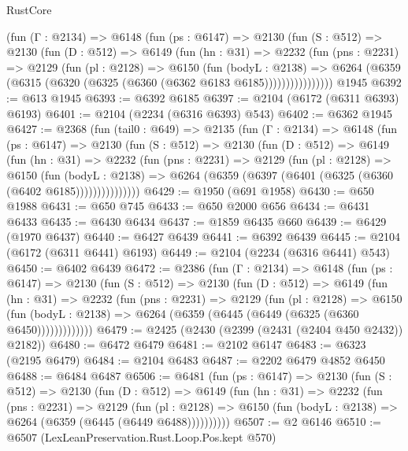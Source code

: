 \begin{lexlean}{RustCore}
\begin{coremodule}
        (fun (Γ : @2134) =>
        @6148
          (fun (ps : @6147) =>
          @2130
            (fun (S : @512) =>
            @2130
              (fun (D : @512) =>
              @6149
                (fun (hn : @31) =>
                @2232
                  (fun (pns : @2231) =>
                  @2129
                    (fun (pl : @2128) =>
                    @6150
                      (fun (bodyL : @2138) =>
                      @6264 (@6359 (@6315 (@6320 (@6325 (@6360 (@6362 @6183 @6185))))))))))))))))
    @1945
@6392 := @613 @1945
@6393 := @6392 @6185
@6397 := @2104 (@6172 (@6311 @6393) @6193)
@6401 := @2104 (@2234 (@6316 @6393) @543)
@6402 := @6362 @1945
@6427 := @2368
    (fun (tail0 : @649) =>
    @2135
      (fun (Γ : @2134) =>
      @6148
        (fun (ps : @6147) =>
        @2130
          (fun (S : @512) =>
          @2130
            (fun (D : @512) =>
            @6149
              (fun (hn : @31) =>
              @2232
                (fun (pns : @2231) =>
                @2129
                  (fun (pl : @2128) =>
                  @6150
                    (fun (bodyL : @2138) =>
                    @6264 (@6359 (@6397 (@6401 (@6325 (@6360 (@6402 @6185)))))))))))))))
@6429 := @1950 (@691 @1958)
@6430 := @650 @1988
@6431 := @650 @745
@6433 := @650 @2000 @656
@6434 := @6431 @6433
@6435 := @6430 @6434
@6437 := @1859 @6435 @660
@6439 := @6429 (@1970 @6437)
@6440 := @6427 @6439
@6441 := @6392 @6439
@6445 := @2104 (@6172 (@6311 @6441) @6193)
@6449 := @2104 (@2234 (@6316 @6441) @543)
@6450 := @6402 @6439
@6472 := @2386
    (fun (Γ : @2134) =>
    @6148
      (fun (ps : @6147) =>
      @2130
        (fun (S : @512) =>
        @2130
          (fun (D : @512) =>
          @6149
            (fun (hn : @31) =>
            @2232
              (fun (pns : @2231) =>
              @2129
                (fun (pl : @2128) =>
                @6150
                  (fun (bodyL : @2138) =>
                  @6264 (@6359 (@6445 (@6449 (@6325 (@6360 @6450)))))))))))))
@6479 := @2425 (@2430 (@2399 (@2431 (@2404 @450 @2432)) @2182))
@6480 := @6472 @6479
@6481 := @2102 @6147
@6483 := @6323 (@2195 @6479)
@6484 := @2104 @6483
@6487 := @2202 @6479 @4852 @6450
@6488 := @6484 @6487
@6506 := @6481
    (fun (ps : @6147) =>
    @2130
      (fun (S : @512) =>
      @2130
        (fun (D : @512) =>
        @6149
          (fun (hn : @31) =>
          @2232
            (fun (pns : @2231) =>
            @2129
              (fun (pl : @2128) =>
              @6150 (fun (bodyL : @2138) => @6264 (@6359 (@6445 (@6449 @6488))))))))))
@6507 := @2 @6146
@6510 := @6507 (LexLeanPreservation.Rust.Loop.Pos.kept @570)

\end{coremodule}
\end{lexlean}
